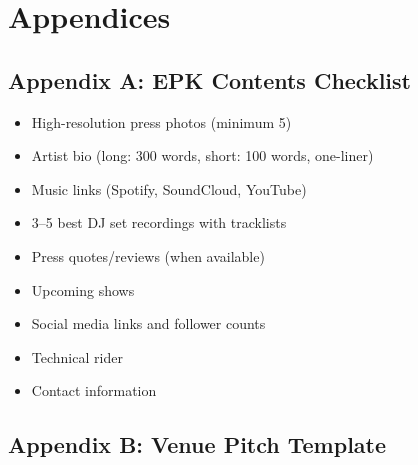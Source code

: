 \documentclass[11pt,a4paper]{article}
\begin{document}
\newpage
\section{Appendices}

\subsection{Appendix A: EPK Contents Checklist}

\begin{itemize}[leftmargin=*]
    \item[$\square$] High-resolution press photos (minimum 5)
    \item[$\square$] Artist bio (long: 300 words, short: 100 words, one-liner)
    \item[$\square$] Music links (Spotify, SoundCloud, YouTube)
    \item[$\square$] 3--5 best DJ set recordings with tracklists
    \item[$\square$] Press quotes/reviews (when available)
    \item[$\square$] Upcoming shows
    \item[$\square$] Social media links and follower counts
    \item[$\square$] Technical rider
    \item[$\square$] Contact information
\end{itemize}

\subsection{Appendix B: Venue Pitch Template}
\end{document}
